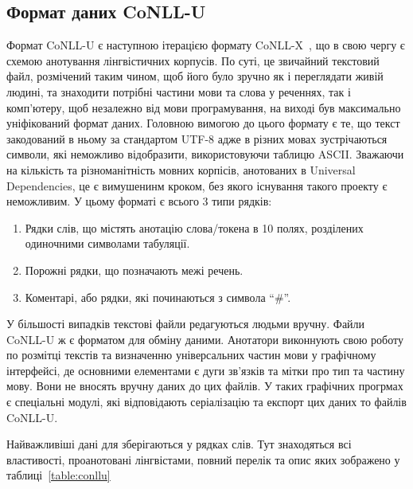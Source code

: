 \subsection{Формат даних CoNLL-U}
Формат CoNLL-U є наступною ітерацією формату CoNLL-X~\cite{bib11},
що в свою чергу є схемою анотування лінгвістичних корпусів.
По суті, це звичайний текстовий файл, розмічений таким чином, щоб
його було зручно як і переглядати живій людині, та знаходити потрібні
частини мови та слова у реченнях, так і комп'ютеру, щоб незалежно
від мови програмування, на виході був максимально уніфікований формат даних.
Головною вимогою до цього формату є те, що текст закодований в ньому за
стандартом UTF-8 адже в різних мовах зустрічаються символи, які
неможливо відобразити, використовуючи таблицю ASCII. Зважаючи на
кількість та різноманітність мовних корпісів, анотованих в Universal Dependencies,
це є вимушенинм кроком, без якого існування такого проекту є неможливим.
У цьому форматі є всього 3 типи рядків:

\begin{enumerate}
    \item Рядки слів, що містять анотацію слова/токена в 10 полях, розділених одиночними символами табуляції.
    \item Порожні рядки, що позначають межі речень.
    \item Коментарі, або рядки, які починаються з символа ``\#''.
\end{enumerate}

У більшості випадків текстові файли редагуються людьми вручну. Файли
CoNLL-U ж є форматом для обміну даними. Анотатори виконнують свою
роботу по розмітці текстів та визначенню універсальних частин мови
у графічному інтерфейсі, де основними елементами є дуги зв'язків
та мітки про тип та частину мову. Вони не вносять вручну даних до
цих файлів. У таких графічних прогрмах є спеціальні модулі,
які відповідають серіалізацію та експорт цих даних то файлів CoNLL-U.

Найважливіші дані для зберігаються у рядках слів. Тут знаходяться всі властивості,
проанотовані лінгвістами, повний перелік та опис яких зображено у
таблиці~\ref{table:conllu}

